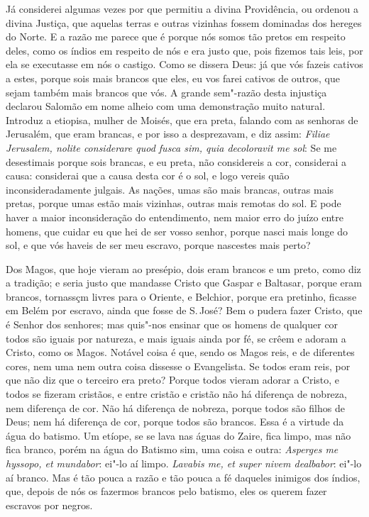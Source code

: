 Já considerei algumas vezes por que permitiu a divina Providência, ou
ordenou a divina Justiça, que aquelas terras e outras vizinhas fossem
dominadas dos hereges do Norte. E a razão me parece que é porque nós
somos tão pretos em respeito deles, como os índios em respeito de nós e
era justo que, pois fizemos tais leis, por ela se executasse em nós o
castigo. Como se dissera Deus: já que vós fazeis cativos a estes, porque
sois mais brancos que eles, eu vos farei cativos de outros, que sejam
também mais brancos que vós. A grande sem"-razão desta injustiça declarou
Salomão em nome alheio com uma demonstração muito natural. Introduz a
etiopisa, mulher de Moisés, que era preta, falando com as senhoras de
Jerusalém, que eram brancas, e por isso a desprezavam, e diz assim:
\emph{Filiae Jerusalem, nolite considerare quod fusca sim, quia
decoloravit me sol}: Se me desestimais porque sois brancas, e eu
preta, não considereis a cor, considerai a causa: considerai que a causa
desta cor é o sol, e logo vereis quão inconsideradamente julgais. As
nações, umas são mais brancas, outras mais pretas, porque umas estão
mais vizinhas, outras mais remotas do sol. E pode haver a maior
inconsideração do entendimento, nem maior erro do juízo entre homens,
que cuidar eu que hei de ser vosso senhor, porque nasci mais longe do
sol, e que vós haveis de ser meu escravo, porque nascestes mais perto?

Dos Magos, que hoje vieram ao presépio, dois eram brancos e um preto,
como diz a tradição; e seria justo que mandasse Cristo que Gaspar e
Baltasar, porque eram brancos, tornassçm livres para o Oriente, e
Belchior, porque era pretinho, ficasse em Belém por escravo, ainda que
fosse de S.\,José? Bem o pudera fazer Cristo, que é Senhor dos senhores;
mas quis"-nos ensinar que os homens de qualquer cor todos são iguais por
natureza, e mais iguais ainda por fé, se crêem e adoram a Cristo, como
os Magos. Notável coisa é que, sendo os Magos reis, e de diferentes
cores, nem uma nem outra coisa dissesse o Evangelista. Se todos eram
reis, por que não diz que o terceiro era preto? Porque todos vieram
adorar a Cristo, e todos se fizeram cristãos, e entre cristão e cristão
não há diferença de nobreza, nem diferença de cor. Não há diferença de
nobreza, porque todos são filhos de Deus; nem há diferença de cor,
porque todos são brancos. Essa é a virtude da água do batismo. Um
etíope, se se lava nas águas do Zaire, fica limpo, mas não fica branco,
porém na água do Batismo sim, uma coisa e outra: \emph{Asperges me
hyssopo, et mundabor}: ei"-lo aí limpo. \emph{Lavabis me,
et super nivem dealbabor}: ei"-lo aí branco. Mas é tão pouca
a razão e tão pouca a fé daqueles inimigos dos índios, que, depois de
nós os fazermos brancos pelo batismo, eles os querem fazer escravos por
negros.

